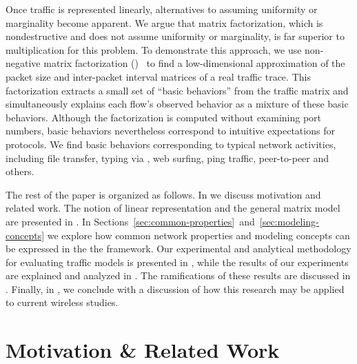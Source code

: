 \documentclass[twocolumn,final]{svjour3}
\begin{document}


Once traffic is represented linearly, alternatives to assuming uniformity or marginality become apparent.
We argue that matrix factorization, which is nondestructive and does not assume uniformity or marginality, is far superior to multiplication for this problem.
To demonstrate this approach, we use non-negative matrix factorization ()~\cite{Lee01} to find a low-dimensional approximation of the packet size and inter-packet interval matrices of a real traffic trace.
This factorization extracts a small set of ``basic behaviors'' from the traffic matrix and simultaneously explains each flow's observed behavior as a mixture of these basic behaviors.
Although the factorization is computed without examining port numbers, basic behaviors nevertheless correspond to intuitive expectations for protocols.
We find basic behaviors corresponding to typical network activities, including file transfer, typing via , web surfing, ping traffic, peer-to-peer and others.


The rest of the paper is organized as follows. In  we discuss motivation and related work. The notion of linear representation and the general matrix model are presented in . In Sections~\ref{sec:common-properties}~and~\ref{sec:modeling-concepts} we explore how common network properties and modeling concepts can be expressed in the the  framework. Our experimental and analytical methodology for evaluating traffic models is presented in , while the results of our experiments are explained and analyzed in . The ramifications of these results are discussed in . Finally, in , we conclude with a discussion of how this research may be applied to current wireless studies.

\section{Motivation \& Related Work}
\label{sec:related-work}
\label{sec:motivation}

\end{document}
